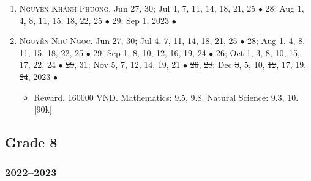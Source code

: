 \documentclass{article}
\begin{document}
\begin{enumerate}
\begin{itemize}
	\end{itemize}
	\item \textsc{Nguyễn Khánh Phương.} {\sf[In]} Jun 27, 30; Jul 4, 7, 11, 14, 18, 21, 25 $\bullet$ 28; Aug 1, 4, 8, 11, 15, 18, 22, 25 $\bullet$ 29; Sep 1, 2023 $\bullet$ \sf{[Out]}
	\item \textsc{Nguyễn Như Ngọc.} {\sf[In]} Jun 27, 30; Jul 4, 7, 11, 14, 18, 21, 25 $\bullet$ 28; Aug 1, 4, 8, 11, 15, 18, 22, 25 $\bullet$ 29; Sep 1, 8, 10, 12, 16, 19, 24 $\bullet$ 26; Oct 1, 3, 8, 10, 15, 17, 22, 24 $\bullet$ \st{29}, 31; Nov 5, 7, 12, 14, 19, 21 $\bullet$ \st{26}, \st{28}; Dec \st{3}, 5, 10, \st{12}, 17, 19, \st{24}, 2023 $\bullet$ {\sf[Out]}
	\begin{itemize}
		\item {\sf Reward.} 160000 VND. Mathematics: 9.5, 9.8. Natural Science: 9.3, 10. [90k]
	\end{itemize}
\end{enumerate}


\subsection{Grade 8}

\subsubsection{2022--2023}
\end{document}
